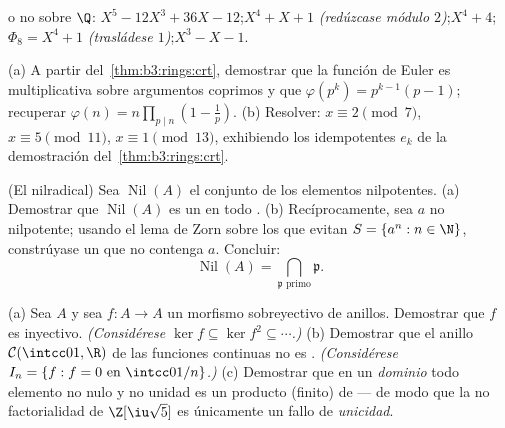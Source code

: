 \begin{exercise}[$\star\star$]\label{exo:b3:rings:7}
 o no sobre $\Q$:
$X^5 - 12X^3 + 36X - 12$;\quad $X^4 + X + 1$ \emph{(redúzcase módulo
$2$)};\quad $X^4 + 4$;\quad $\Phi_8 = X^4 + 1$ \emph{(trasládese
$1$)};\quad $X^3 - X - 1$.
\end{exercise}

\begin{exercise}[$\star\star$]\label{exo:b3:rings:8}
(a) A partir del~\cref{thm:b3:rings:crt}, demostrar que la función de
Euler es multiplicativa sobre argumentos coprimos y que $\varphi(p^k) =
p^{k-1}(p-1)$; recuperar $\varphi(n) = n\prod_{p \mid n}(1 -
\frac1p)$. (b) Resolver: $x \equiv 2 \pmod 7$, $x \equiv 5 \pmod{11}$,
$x
\equiv 1 \pmod{13}$, exhibiendo los idempotentes $e_k$ de la
demostración del~\cref{thm:b3:rings:crt}.
\end{exercise}

\begin{exercise}[$\star\star\star$]\label{exo:b3:rings:9}
(El nilradical) Sea $\operatorname{Nil}(A)$ el conjunto de los elementos
nilpotentes. (a) Demostrar que $\operatorname{Nil}(A)$ es un
  en todo
. (b) Recíprocamente, sea
$a$ no nilpotente; usando el lema de Zorn sobre los
 que evitan $S =
\{a^n : n \in \N\}$, constrúyase un
 que no contenga $a$.
Concluir:
\[
\operatorname{Nil}(A) = \bigcap_{\mathfrak p \text{ primo}}
\mathfrak p .
\]
\end{exercise}

\begin{exercise}[$\star\star\star$]\label{exo:b3:rings:10}
(a) Sea $A$  y sea
$f \colon A \to A$ un morfismo sobreyectivo de anillos. Demostrar que
$f$ es inyectivo. \emph{(Considérese $\ker
f \subseteq \ker f^2 \subseteq \cdots$.)} (b) Demostrar que el anillo
$\mathcal C(\intcc01, \R)$ de las funciones continuas no es
. \emph{(Considérese
$I_n = \{f : f = 0
\text{ en } \intcc0{1/n}\}$.)} (c) Demostrar que en un \emph{dominio}
 todo elemento no nulo y no
unidad es un producto (finito) de
 --- de modo que la no
factorialidad de $\Z[\iu\sqrt 5]$ es únicamente un fallo de
\emph{unicidad}.
\end{exercise}

